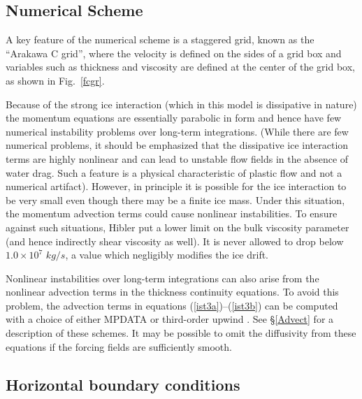 \subsection{Numerical Scheme}

A key feature of the numerical scheme is a staggered grid, known as
the ``Arakawa C grid'', where the velocity is defined on the sides of a
grid box and variables such as thickness and viscosity are defined
at the center of the grid box, as shown in Fig.\ \ref{fcgr}.

Because of the strong ice interaction (which in this model is
dissipative in nature) the momentum equations are essentially
parabolic in form and hence have few numerical instability problems
over long-term integrations.  (While there are few numerical
problems, it should be emphasized that the dissipative ice
interaction terms are highly nonlinear and can lead to unstable flow
fields in the absence of water drag.  Such a feature is a physical
characteristic of plastic flow and not a numerical artifact).
However, in principle it is possible for the ice interaction to be
very small even though there may be a finite ice mass.  Under this
situation, the momentum advection terms could cause nonlinear
instabilities.  To ensure against such situations, Hibler put a lower
limit on the bulk viscosity parameter
(and hence indirectly shear viscosity as well). It is never
allowed to drop below $1.0 \times 10^7$ $kg/s$, a value which
negligibly modifies the ice drift.

Nonlinear instabilities over long-term integrations can also arise from
the nonlinear advection terms in the thickness continuity equations.
To avoid this problem, the advection terms in equations
(\ref{ist3a})--(\ref{ist3b}) can be computed with a choice of either
MPDATA \citep{Smolark90} or third-order upwind
\citep{Leonard79}. See \S\ref{Advect} for a description of
these schemes. It may be possible to omit the diffusivity from these
equations if the forcing fields are sufficiently smooth.

\subsection{Horizontal boundary conditions}

